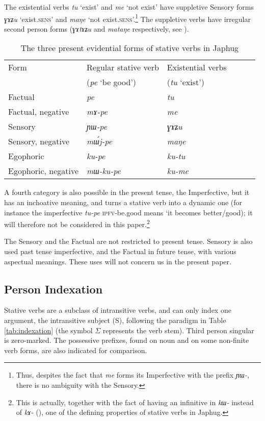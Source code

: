 \documentclass[11pt]{article}
\newcommand{\ipa}[1]{{\phon\textit{#1}}} %
\newcommand{\ro}{$\Sigma$}
\begin{document}
The existential verbs \ipa{tu} `exist' and \ipa{me} `not exist' have suppletive Sensory forms \ipa{ɣɤʑu} `exist.\textsc{sens}' and \ipa{maŋe} `not exist.\textsc{sens}'.\footnote{Thus, despites the fact that \ipa{me} forms its Imperfective with the prefix \ipa{ɲɯ-}, there is no ambiguity with the Sensory.} The suppletive verbs have irregular second person forms (\ipa{ɣɤtɤʑu} and \ipa{mataŋe} respectively, see \citealt{jacques12agreement}).

\begin{table}[H]
\caption{The three present evidential forms of stative verbs in Japhug} \label{tab:three} \centering
\begin{tabular}{llllll}
\toprule
Form & Regular stative verb & Existential verbs \\
&(\ipa{pe} `be good') & (\ipa{tu} `exist') \\
\midrule
Factual & \ipa{pe} & \ipa{tu} \\
Factual, negative & \ipa{mɤ-pe} & \ipa{me} \\
Sensory & \ipa{ɲɯ-pe} & \ipa{ɣɤʑu} \\
Sensory, negative & \ipa{mɯ́j-pe} & \ipa{maŋe} \\
Egophoric &  \ipa{ku-pe} & \ipa{ku-tu} \\
Egophoric, negative & \ipa{mɯ-ku-pe} & \ipa{ku-me} \\
\midrule
\end{tabular}
\end{table}

A fourth category is also possible in the present tense, the Imperfective, but it has an inchoative meaning, and turns a stative verb into a dynamic one (for instance the imperfective \ipa{tu-pe} \textsc{ipfv}-be.good means `it becomes better/good); it will therefore not be considered in this paper.\footnote{This is actually, together with the fact of having an infinitive in \ipa{kɯ-} instead of \ipa{kɤ-} (\citealt[227]{jacques16complementation}), one of the defining properties of stative verbs in Japhug.}

The Sensory and the Factual are not restricted to present tense. Sensory is also used past tense imperfective, and the Factual in future tense, with various aspectual meanings. These uses will not concern us in the present paper.


\subsection{Person Indexation}
Stative verbs are a subclass of intransitive verbs, and can only index one argument, the intransitive subject (S), following the paradigm in Table \ref{tab:indexation} (the symbol \ro{} represents the verb stem). Third person singular is zero-marked. The possessive prefixes, found on noun and on some non-finite verb forms, are also indicated for comparison.
\end{document}
